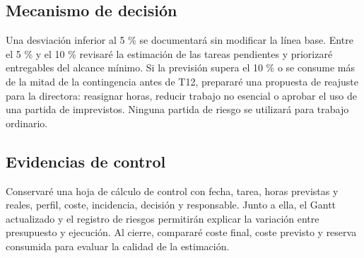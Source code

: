 \subsection{Mecanismo de decisión}\label{sec:3-3-1}

Una desviación inferior al 5 \% se documentará sin modificar la línea base. Entre el 5 \% y el 10 \% revisaré la estimación de las tareas pendientes y priorizaré entregables del alcance mínimo. Si la previsión supera el 10 \% o se consume más de la mitad de la contingencia antes de T12, prepararé una propuesta de reajuste para la directora: reasignar horas, reducir trabajo no esencial o aprobar el uso de una partida de imprevistos. Ninguna partida de riesgo se utilizará para trabajo ordinario.

\subsection{Evidencias de control}\label{sec:3-3-2}

Conservaré una hoja de cálculo de control con fecha, tarea, horas previstas y reales, perfil, coste, incidencia, decisión y responsable. Junto a ella, el Gantt actualizado y el registro de riesgos permitirán explicar la variación entre presupuesto y ejecución. Al cierre, compararé coste final, coste previsto y reserva consumida para evaluar la calidad de la estimación.

